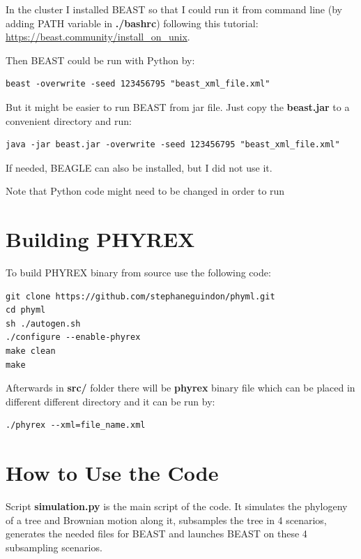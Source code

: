 In the cluster I installed BEAST so that I could run it from command line (by adding PATH variable in \textbf{./bashrc}) following this tutorial: \url{https://beast.community/install_on_unix}.

Then BEAST could be run with Python by:

\begin{verbatim}
beast -overwrite -seed 123456795 "beast_xml_file.xml"
\end{verbatim}

But it might be easier to run BEAST from jar file. Just copy the \textbf{beast.jar} to a convenient directory and run:

\begin{verbatim}
java -jar beast.jar -overwrite -seed 123456795 "beast_xml_file.xml"
\end{verbatim}

If needed, BEAGLE can also be installed, but I did not use it.

Note that Python code might need to be changed in order to run 


\section*{Building PHYREX}
To build PHYREX binary from source use the following code:
\begin{verbatim}
git clone https://github.com/stephaneguindon/phyml.git
cd phyml
sh ./autogen.sh
./configure --enable-phyrex
make clean
make
\end{verbatim}

Afterwards in \textbf{src/} folder there will be \textbf{phyrex} binary file which can be placed in different different directory and it can be run by:

\begin{verbatim}
./phyrex --xml=file_name.xml
\end{verbatim}

\clearpage

\section*{How to Use the Code}






Script \textbf{simulation.py} is the main script of the code. It simulates the phylogeny of a tree and Brownian motion along it, subsamples the tree in 4 scenarios, generates the needed files for BEAST and launches BEAST on these 4 subsampling scenarios.

